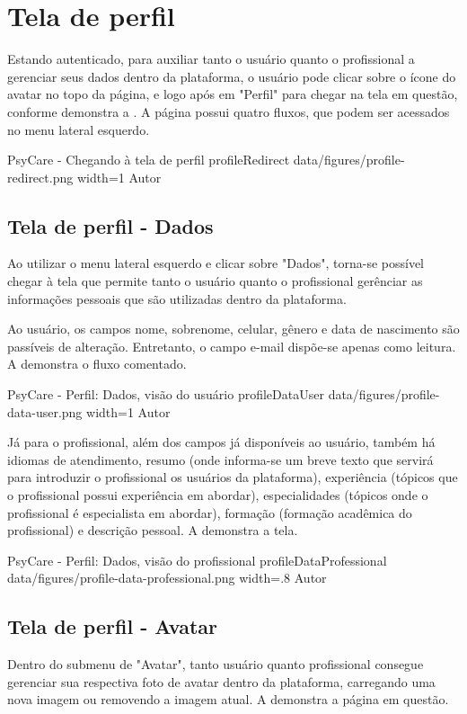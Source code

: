 \section{Tela de perfil}
\label{sec:perfil}

Estando autenticado, para auxiliar tanto o usuário quanto o profissional a gerenciar seus dados dentro da plataforma, o usuário pode clicar sobre o ícone do avatar no topo da página, e logo após em "Perfil" para chegar na tela em questão, conforme demonstra a . A página possui quatro fluxos, que podem ser acessados no menu lateral esquerdo.

\image
    {PsyCare - Chegando à tela de perfil}
    {profileRedirect}
    {data/figures/profile-redirect.png}
    {width=1\textwidth}
    {Autor}


\subsection{Tela de perfil - Dados}
\label{sec:perfilDados}
Ao utilizar o menu lateral esquerdo e clicar sobre "Dados", torna-se possível chegar à tela que permite tanto o usuário quanto o profissional gerênciar as informações pessoais que são utilizadas dentro da plataforma.

Ao usuário, os campos nome, sobrenome, celular, gênero e data de nascimento são passíveis de alteração. Entretanto, o campo e-mail dispõe-se apenas como leitura. A  demonstra o fluxo comentado.

\image
    {PsyCare - Perfil: Dados, visão do usuário}
    {profileDataUser}
    {data/figures/profile-data-user.png}
    {width=1\textwidth}
    {Autor}

Já para o profissional, além dos campos já disponíveis ao usuário, também há idiomas de atendimento, resumo (onde informa-se um breve texto que servirá para introduzir o profissional os usuários da plataforma), experiência (tópicos que o profissional possui experiência em abordar), especialidades (tópicos onde o profissional é especialista em abordar), formação (formação acadêmica do profissional) e descrição pessoal. A  demonstra a tela.

\image
    {PsyCare - Perfil: Dados, visão do profissional}
    {profileDataProfessional}
    {data/figures/profile-data-professional.png}
    {width=.8\textwidth}
    {Autor}

\subsection{Tela de perfil - Avatar}
\label{sec:perfilAvatar}
Dentro do submenu de "Avatar", tanto usuário quanto profissional consegue gerenciar sua respectiva foto de avatar dentro da plataforma, carregando uma nova imagem ou removendo a imagem atual. A  demonstra a página em questão.

